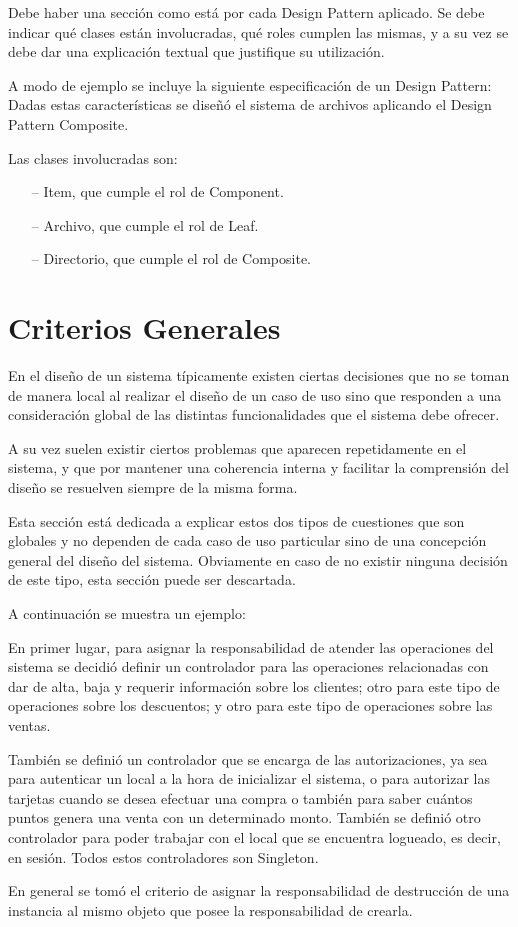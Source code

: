 \documentclass[10pt,spanish]{article}
\numberwithin{figure}{section} %
\newcounter{subsubsubsection}[subsubsection]
\begin{document}
\begin{siderules}
Debe haber una sección como está por cada Design Pattern aplicado. Se debe indicar qué clases están involucradas, qué roles cumplen las mismas, y a su vez se debe dar una explicación textual que justifique su utilización.

A modo de ejemplo se incluye la siguiente especificación de un Design Pattern:
Dadas estas características se diseñó el sistema de archivos aplicando el Design Pattern Composite. 

Las clases involucradas son:
\begin{itemize}
\item[--] Item, que cumple el rol de Component.
\item[--] Archivo, que cumple el rol de Leaf.
\item[--] Directorio, que cumple el rol de Composite.
\end{itemize}
\end{siderules}

\section{Criterios Generales}
\begin{siderules}
En el diseño de un sistema típicamente existen ciertas decisiones que no se toman de manera local al realizar el diseño de un caso de uso sino que responden a una consideración global de las distintas funcionalidades que el sistema debe ofrecer.

A su vez suelen existir ciertos problemas que aparecen repetidamente en el sistema, y que por mantener una coherencia interna y facilitar la comprensión del diseño se resuelven siempre de la misma forma.

Esta sección está dedicada a explicar estos dos tipos de cuestiones que son globales y no dependen de cada caso de uso particular sino de una concepción general del diseño del sistema. Obviamente en caso de no existir ninguna decisión de este tipo, esta sección puede ser descartada.

A continuación se muestra un ejemplo:

En primer lugar, para asignar la responsabilidad de atender las operaciones del sistema se decidió definir un controlador para las operaciones relacionadas con dar de alta, baja y requerir información sobre los clientes; otro para este tipo de operaciones sobre los descuentos; y otro para este tipo de operaciones sobre las ventas.

También se definió un controlador que se encarga de las autorizaciones, ya sea para autenticar un local a la hora de inicializar el sistema, o para autorizar las tarjetas cuando se desea efectuar una compra o también para saber cuántos puntos genera una venta con un determinado monto. También se definió otro controlador para poder trabajar con el local que se encuentra logueado, es decir, en sesión. Todos estos controladores son Singleton.

En general se tomó el criterio de asignar la responsabilidad de destrucción de una instancia al mismo objeto que posee la responsabilidad de crearla.
\end{siderules}
\end{document}
